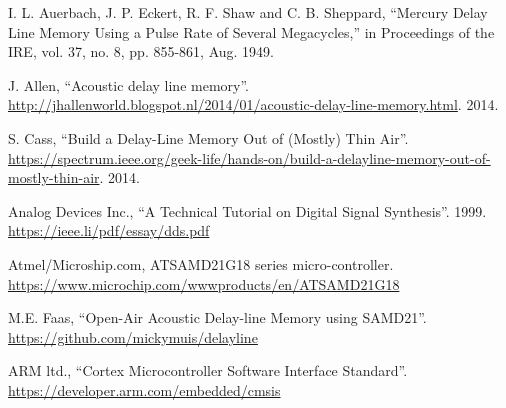 \documentclass[10pt,a4paper,twocolumn]{article}
\begin{document}
\begin{thebibliography}{}

I. L. Auerbach, J. P. Eckert, R. F. Shaw and C. B. Sheppard, ``Mercury Delay Line Memory Using a Pulse Rate of Several Megacycles,'' in Proceedings of the IRE, vol. 37, no. 8, pp. 855-861, Aug. 1949.

J. Allen, ``Acoustic delay line memory''. \url{http://jhallenworld.blogspot.nl/2014/01/acoustic-delay-line-memory.html}. 2014.

S. Cass, ``Build a Delay-Line Memory Out of (Mostly) Thin Air''. \url{https://spectrum.ieee.org/geek-life/hands-on/build-a-delayline-memory-out-of-mostly-thin-air}. 2014.

Analog Devices Inc., ``A Technical Tutorial on Digital Signal Synthesis''. 1999.
\url{https://ieee.li/pdf/essay/dds.pdf}

Atmel/Microship.com, ATSAMD21G18 series micro-controller.
\url{https://www.microchip.com/wwwproducts/en/ATSAMD21G18}

M.E. Faas, ``Open-Air Acoustic Delay-line Memory using SAMD21''. \url{https://github.com/mickymuis/delayline}

ARM ltd., ``Cortex Microcontroller Software Interface Standard''. \url{https://developer.arm.com/embedded/cmsis}

\end{thebibliography}
\end{document}
